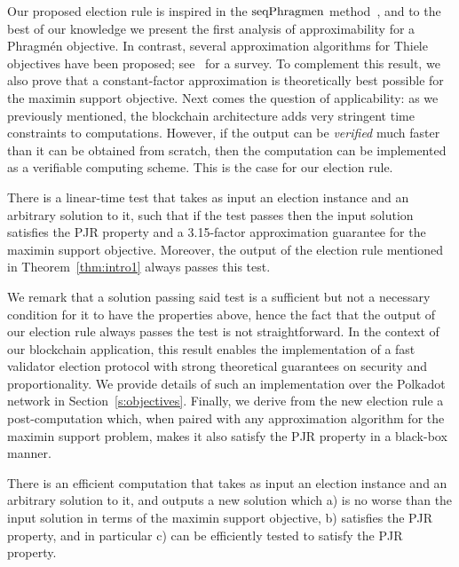 Our proposed election rule is inspired in the $\operatorname{seqPhragmen}$ method~\cite{brill2017phragmen}, and to the best of our knowledge we present the first analysis of approximability for a Phragm\'{e}n objective. 
In contrast, several approximation algorithms for Thiele objectives have been proposed; see~\cite{lackner2020approval} for a survey. To complement this result, we also prove that a constant-factor approximation is theoretically best possible for the maximin support objective. 
%
Next comes the question of applicability: as we previously mentioned, the blockchain architecture adds very stringent time constraints to computations. However, if the output can be \emph{verified} much faster than it can be obtained from scratch, then the computation can be implemented as a verifiable computing scheme. This is the case for our election rule.

\begin{theorem}\label{thm:intro2}
There is a linear-time test that takes as input an election instance and an arbitrary solution to it, such that if the test passes then the input solution satisfies the PJR property and a 3.15-factor approximation guarantee for the maximin support objective. 
Moreover, the output of the election rule mentioned in Theorem~\ref{thm:intro1} always passes this test.
\end{theorem}

We remark that a solution passing said test is a sufficient but not a necessary condition for it to have the properties above, hence the fact that the output of our election rule always passes the test is not straightforward.
In the context of our blockchain application, this result enables the implementation of a fast validator election protocol with strong theoretical guarantees on security and proportionality. 
We provide details of such an implementation over the Polkadot network in Section~\ref{s:objectives}.
%
Finally, we derive from the new election rule a post-computation which, when paired with any approximation algorithm for the maximin support problem, makes it also satisfy the PJR property in a black-box manner.

\begin{theorem}\label{thm:intro3}
There is an efficient computation that takes as input an election instance and an arbitrary solution to it, and outputs a new solution which a) is no worse than the input solution in terms of the maximin support objective, b) satisfies the PJR property, and in particular c) can be efficiently tested to satisfy the PJR property.
\end{theorem}

